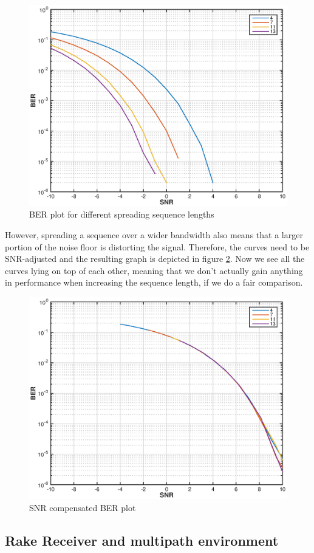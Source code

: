 \documentclass[a4paper]{article}
\begin{document}
\begin{figure}[htbp]
\begin{center}
\includegraphics[width=.6\textwidth]{img1/spreading_lengths.eps}
\caption{BER plot for different spreading sequence lengths}
\label{fig:spreadlength}
\end{center}
\end{figure}

However, spreading a sequence over a wider bandwidth also means that a larger portion of the noise floor is distorting the signal. Therefore, the curves need to be SNR-adjusted and the resulting graph is depicted in figure \ref{fig:compensated}. Now we see all the curves lying on top of each other, meaning that we don't actually gain anything in performance when increasing the sequence length, if we do a fair comparison.

\begin{figure}[htbp]
\begin{center}
\includegraphics[width=.6\textwidth]{img1/compensated.eps}
\caption{SNR compensated BER plot}
\label{fig:compensated}
\end{center}
\end{figure}

\subsection{Rake Receiver and multipath environment}
\end{document}
